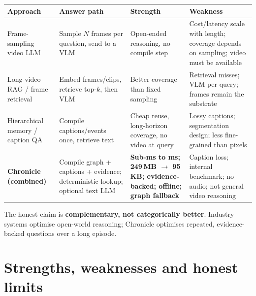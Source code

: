 \documentclass[10pt,a4paper]{article}
\begin{document}
\begin{center}
\small
\begin{tabularx}{\linewidth}{@{}p{2.05cm} L L L@{}}
\toprule
\textbf{Approach} & \textbf{Answer path} & \textbf{Strength} & \textbf{Weakness} \\
\midrule
Frame-sampling video LLM & Sample \(N\) frames per question, send to a VLM & Open-ended reasoning, no compile step & Cost/latency scale with length; coverage depends on sampling; video must be available \\
Long-video RAG / frame retrieval & Embed frames/clips, retrieve top-\(k\), then VLM & Better coverage than fixed sampling & Retrieval misses; VLM per query; frames remain the substrate \\
Hierarchical memory / caption QA & Compile captions/events once, retrieve text & Cheap reuse, long-horizon coverage, no video at query & Lossy captions; segmentation design; less fine-grained than pixels \\
\textbf{Chronicle (combined)} & Compile graph + captions + evidence; deterministic lookup; optional text LLM & \textbf{Sub-ms to ms; 249\,MB \(\rightarrow\) 95\,KB; evidence-backed; offline; graph fallback} & Caption loss; internal benchmark; no audio; not general video reasoning \\
\bottomrule
\end{tabularx}
\end{center}

\noindent
The honest claim is \textbf{complementary, not categorically better}. Industry systems optimise
open-world reasoning; Chronicle optimises repeated, evidence-backed questions over a long episode.

\section{Strengths, weaknesses and honest limits}
\end{document}
